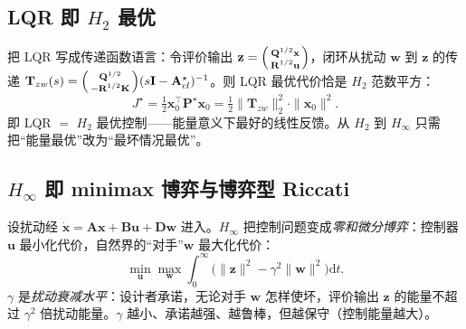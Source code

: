 \subsection{LQR 即 \texorpdfstring{$H_2$}{H2} 最优}
\label{sec:lqr-h2}

把 LQR 写成传递函数语言：令评价输出 $\mathbf z=\begin{psmallmatrix}\mathbf Q^{1/2}\mathbf x\\\mathbf R^{1/2}\mathbf u\end{psmallmatrix}$，闭环从扰动 $\mathbf w$ 到 $\mathbf z$ 的传递 $\mathbf T_{zw}(s)=\begin{psmallmatrix}\mathbf Q^{1/2}\\-\mathbf R^{1/2}\mathbf K\end{psmallmatrix}(s\mathbf I-\mathbf A_{cl}^\star)^{-1}$。则 LQR 最优代价恰是 $H_2$ 范数平方：
\begin{equation}
  J^\star=\tfrac12\mathbf x_0^\top\mathbf P^\star\mathbf x_0=\tfrac12\|\mathbf T_{zw}\|_2^2\cdot\|\mathbf x_0\|^2.
  \label{eq:lqr-h2}
\end{equation}
即 LQR $=$ $H_2$ 最优控制——能量意义下最好的线性反馈。从 $H_2$ 到 $H_\infty$ 只需把“能量最优”改为“最坏情况最优”。

\subsection{\texorpdfstring{$H_\infty$}{H-infinity} 即 minimax 博弈与博弈型 Riccati}
\label{sec:lqr-hinf-game}

设扰动经 $\dot{\mathbf x}=\mathbf A\mathbf x+\mathbf B\mathbf u+\mathbf D\mathbf w$ 进入。$H_\infty$ 把控制问题变成\emph{零和微分博弈}：控制器 $\mathbf u$ 最小化代价，自然界的“对手”$\mathbf w$ 最大化代价：
\begin{equation}
  \min_{\mathbf u}\max_{\mathbf w}\int_0^\infty\big(\|\mathbf z\|^2-\gamma^2\|\mathbf w\|^2\big)\mathrm dt.
  \label{eq:lqr-hinf-game}
\end{equation}
$\gamma$ 是\emph{扰动衰减水平}：设计者承诺，无论对手 $\mathbf w$ 怎样使坏，评价输出 $\mathbf z$ 的能量不超过 $\gamma^2$ 倍扰动能量。$\gamma$ 越小、承诺越强、越鲁棒，但越保守（控制能量越大）。

